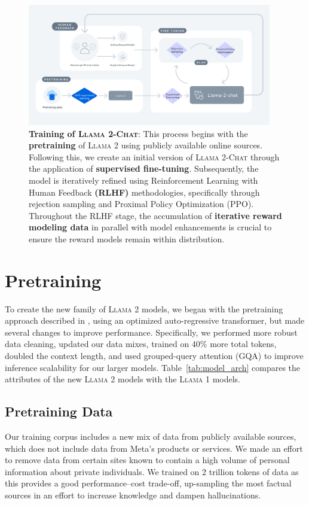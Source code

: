 \documentclass{article}
\newcommand{\modelname}{\textsc{Llama 2-Chat}\xspace}
\newcommand{\anise}{\textsc{Llama 1}\xspace}
\newcommand{\cinnamon}{\textsc{Llama 2}\xspace}
\begin{document}
\begin{figure}[htbp]
\centering
\includegraphics[trim={.5cm 1cm .5cm 1cm},clip,width=0.95\textwidth]{RLHF_chart2.jpg}
\caption{
\textbf{Training of \modelname}:  This process begins with the \textbf{pretraining} of \cinnamon using publicly available online sources. Following this, we create an initial version of \modelname through the application of \textbf{supervised fine-tuning}. Subsequently, the model is iteratively refined using Reinforcement Learning with Human Feedback \textbf{(RLHF)} methodologies, specifically through rejection sampling and Proximal Policy Optimization (PPO). Throughout the RLHF stage, the accumulation of \textbf{iterative reward modeling data} in parallel with model enhancements is crucial to ensure the reward models remain within distribution.} 
\label{fig:training_process}
\end{figure}


\section{Pretraining}
\label{sec:pretraining}
To create the new family of \cinnamon models, we began with the pretraining approach described in \cite{Touvron2023LLaMAOA}, using an optimized auto-regressive transformer, but made several changes to improve performance. Specifically, we performed more robust data cleaning, updated our data mixes, trained on 40\% more total tokens, doubled the context length, and used grouped-query attention (GQA) to improve inference scalability for our larger models. Table~\ref{tab:model_arch} compares the attributes of the new \cinnamon models with the \anise models.

\subsection{Pretraining Data} \label{sec:pretraining_data}
Our training corpus includes a new mix of data from publicly available sources, which does not include data from Meta's products or services. We made an effort to remove data from certain sites known to contain a high volume of personal information about private individuals. We trained on 2 trillion tokens of data as this provides a good performance--cost trade-off, up-sampling the most factual sources in an effort to increase knowledge and dampen hallucinations.
\end{document}
